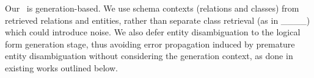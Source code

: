 Our \model\ is generation-based. We use schema contexts (relations and classes) from retrieved relations and entities, rather than separate class retrieval (as in ____) which could introduce noise. We also defer entity disambiguation to the logical form generation stage, thus avoiding error propagation induced by premature entity disambiguation without considering the generation context, as done in existing works outlined below. 











